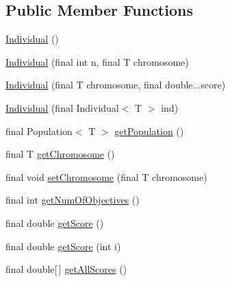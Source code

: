 \subsection*{Public Member Functions}
\begin{DoxyCompactItemize}
\item 
\hyperlink{classjenes_1_1population_1_1_individual_3_01_t_01extends_01_chromosome_01_4_aaef7161bf62cee0ac95f079394fdac9f}{Individual} ()
\item 
\hyperlink{classjenes_1_1population_1_1_individual_3_01_t_01extends_01_chromosome_01_4_ab976f777177706bca918974cc60728c9}{Individual} (final int n, final T chromosome)
\item 
\hyperlink{classjenes_1_1population_1_1_individual_3_01_t_01extends_01_chromosome_01_4_a0ee89d719da75153410f8757ebafdb0d}{Individual} (final T chromosome, final double...\-score)
\item 
\hyperlink{classjenes_1_1population_1_1_individual_3_01_t_01extends_01_chromosome_01_4_a39ca92146563b3b00576736296b523a5}{Individual} (final Individual$<$ T $>$ ind)
\item 
final Population$<$ T $>$ \hyperlink{classjenes_1_1population_1_1_individual_3_01_t_01extends_01_chromosome_01_4_a15020083468eb11265c621aca7de0bf2}{get\-Population} ()
\item 
final T \hyperlink{classjenes_1_1population_1_1_individual_3_01_t_01extends_01_chromosome_01_4_aeed25204463ec1e7eebe36674a24ada7}{get\-Chromosome} ()
\item 
final void \hyperlink{classjenes_1_1population_1_1_individual_3_01_t_01extends_01_chromosome_01_4_a14c0669f286f8097bb8fdf13dc5fcf50}{set\-Chromosome} (final T chromosome)
\item 
final int \hyperlink{classjenes_1_1population_1_1_individual_3_01_t_01extends_01_chromosome_01_4_a1c109dce60908107cc2dcfaf630b95f5}{get\-Num\-Of\-Objectives} ()
\item 
final double \hyperlink{classjenes_1_1population_1_1_individual_3_01_t_01extends_01_chromosome_01_4_aa95dc3489632913f59c9c9e5d30d89c0}{get\-Score} ()
\item 
final double \hyperlink{classjenes_1_1population_1_1_individual_3_01_t_01extends_01_chromosome_01_4_ad2cc30ec43ca42539e72c4619953fd3b}{get\-Score} (int i)
\item 
final double\mbox{[}$\,$\mbox{]} \hyperlink{classjenes_1_1population_1_1_individual_3_01_t_01extends_01_chromosome_01_4_ad3b9122edf5b711c5f6d860e0f7c36b2}{get\-All\-Scores} ()
\item 

\end{DoxyCompactItemize}
